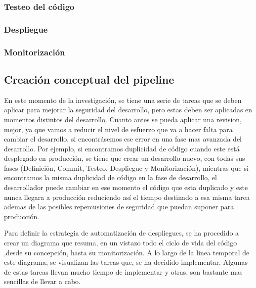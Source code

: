 \documentclass[12pt]{report} %
\begin{document}
\subsubsection{Testeo del código}
\subsubsection{Despliegue}
\subsubsection{Monitorización}

\subsection{Creación conceptual del pipeline}

En este momento de la investigación, se tiene una serie de tareas que se deben
aplicar para mejorar la seguridad del desarrollo, pero estas deben ser aplicadas
en momentos distintos del desarrollo. 
Cuanto antes se pueda aplicar una revision, mejor, ya que vamos a reducir el
nivel de esfuerzo que va a hacer falta para cambiar el desarrollo, si
encontrásemos ese error en una fase mas avanzada del desarrollo.
Por ejemplo, si encontramos duplicidad de código cuando este está
desplegado en producción, se tiene que crear un desarrollo nuevo, con todas sus
fases (Definición, Commit, Testeo, Despliegue y Monitorización), mientras que si
encontramos la misma duplicidad de código en la fase de desarrollo, el
desarrollador puede cambiar en ese momento el código que esta duplicado y este
nunca llegara a producción reduciendo así el tiempo destinado a esa misma tarea
ademas de las posibles repercusiones de seguridad que puedan suponer para
producción. 

Para definir la estrategia de automatización de despliegues, se ha procedido a
crear un diagrama que resuma, en un vistazo todo el ciclo de vida del código
,desde su concepción, hasta su monitorización.
A lo largo de la linea temporal de este diagrama, se visualizan las tareas que,
se ha decidido implementar.
Algunas de estas tareas llevan mucho tiempo de implementar y otras, son bastante
mas sencillas de llevar a cabo.
\end{document}
